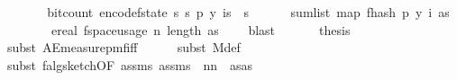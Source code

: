 \begin{isabellebody}
\ \ \ \ \isamarkupfalse%
\ \isamarkupfalse%
\ {\isachardoublequoteopen}bit{\isacharunderscore}{\kern0pt}count\ {\isacharparenleft}{\kern0pt}encode{\isacharunderscore}{\kern0pt}f{}{\isacharunderscore}{\kern0pt}state\ {\isacharparenleft}{\kern0pt}s\ s\ p{\isacharcomma}{\kern0pt}\ y{\isacharcomma}{\kern0pt}\ {\isasymlambda}i{\isasymin}{\isacharbraceleft}{\kern0pt}{}{\isachardot}{\kern0pt}{\isachardot}{\kern0pt}{\isacharless}{\kern0pt}s\ {\isasymtimes}\ {\isacharbraceleft}{\kern0pt}{}{\isachardot}{\kern0pt}{\isachardot}{\kern0pt}{\isacharless}{\kern0pt}s\isanewline
\ \ \ \ \ \ sum{\isacharunderscore}{\kern0pt}list\ {\isacharparenleft}{\kern0pt}map\ {\isacharparenleft}{\kern0pt}f{}{\isacharunderscore}{\kern0pt}hash\ p\ {\isacharparenleft}{\kern0pt}y\ i{\isacharparenright}{\kern0pt}{\isacharparenright}{\kern0pt}\ as{\isacharparenright}{\kern0pt}{\isacharparenright}{\kern0pt}{\isacharparenright}{\kern0pt}\isanewline
\ \ \ \ \ \ \ {\isasymle}\ ereal\ {\isacharparenleft}{\kern0pt}f{}{\isacharunderscore}{\kern0pt}space{\isacharunderscore}{\kern0pt}usage\ {\isacharparenleft}{\kern0pt}n{\isacharcomma}{\kern0pt}\ length\ as{\isacharcomma}{\kern0pt}\ {\isasymepsilon}{\isacharcomma}{\kern0pt}\ {\isasymdelta}{\isacharparenright}{\kern0pt}{\isacharparenright}{\kern0pt}{\isachardoublequoteclose}\ \isamarkupfalse%
\ blast\isanewline
\ \ \isamarkupfalse%
\isanewline
\isanewline
\ \ \isamarkupfalse%
\ {\isacharquery}{\kern0pt}thesis\isanewline
\ \ \ \ \isamarkupfalse%
\ {\isacharparenleft}{\kern0pt}subst\ AE{\isacharunderscore}{\kern0pt}measure{\isacharunderscore}{\kern0pt}pmf{\isacharunderscore}{\kern0pt}iff{\isacharparenright}{\kern0pt}\isanewline
\ \ \ \ \isamarkupfalse%
\ {\isacharparenleft}{\kern0pt}subst\ M{\isacharunderscore}{\kern0pt}def{\isacharparenright}{\kern0pt}\isanewline
\ \ \ \ \isamarkupfalse%
\ {\isacharparenleft}{\kern0pt}subst\ f{}{\isacharunderscore}{\kern0pt}alg{\isacharunderscore}{\kern0pt}sketch{\isacharbrackleft}{\kern0pt}OF\ assms{\isacharparenleft}{\kern0pt}{}{\isacharparenright}{\kern0pt}\ assms{\isacharparenleft}{\kern0pt}{}{\isacharparenright}{\kern0pt}{\isacharcomma}{\kern0pt}\ \ n{\isacharequal}{\kern0pt}{\isachardoublequoteopen}n{\isachardoublequoteclose}\ \ as{\isacharequal}{\kern0pt}{\isachardoublequoteopen}as{\isachardoublequoteclose}{\isacharbrackright}{\kern0pt}{\isacharparenright}{\kern0pt}\isanewline

\end{isabellebody}

